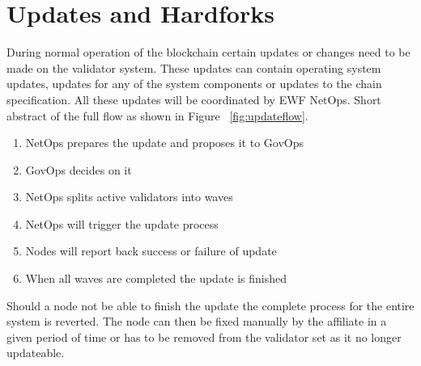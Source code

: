 \section{Updates and Hardforks}

During normal operation of the blockchain certain updates or changes need to be made on the validator system. These updates can contain operating system updates, updates for any of the system components or updates to the chain specification. All these updates will be coordinated by EWF NetOps.
Short abstract of the full flow as shown in Figure ~\ref{fig:updateflow}.

\begin{enumerate}
    \item NetOps prepares the update and proposes it to GovOps
    \item GovOps decides on it
    \item NetOps splits active validators into waves
    \item NetOps will trigger the update process
    \item Nodes will report back success or failure of update
    \item When all waves are completed the update is finished
\end{enumerate}

Should a node not be able to finish the update the complete process for the entire system is reverted. The node can then be fixed manually by the affiliate in a given period of time or has to be removed from the validator set as it no longer updateable.

